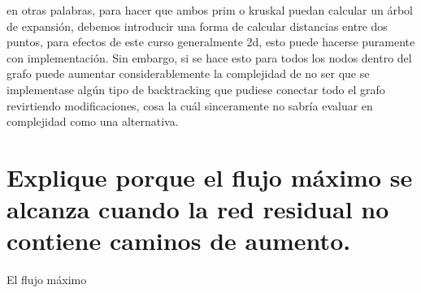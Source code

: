 \documentclass[a4paper]{article}
\begin{document}
en otras palabras, para hacer que ambos prim o kruskal puedan calcular un árbol de
expansión, debemos introducir una forma de calcular distancias entre dos puntos, para
efectos de este curso generalmente 2d, esto puede hacerse puramente con implementación. Sin 
embargo, si se hace esto para todos los nodos dentro del grafo puede aumentar considerablemente
la complejidad de no ser que se implementase algún tipo de backtracking que pudiese
conectar todo el grafo revirtiendo modificaciones, cosa la cuál sinceramente no sabría 
evaluar en complejidad como una alternativa.

\section{Explique porque el flujo máximo se alcanza cuando la red residual no contiene
caminos de aumento.}

El flujo máximo 
\end{document}
